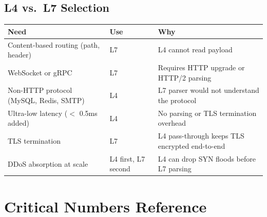\documentclass[11pt,a4paper]{article}
\begin{document}
\subsection{L4 vs.\ L7 Selection}

\medskip
\begin{tabularx}{\linewidth}{@{}lXX@{}}
  \toprule
  \textbf{Need} & \textbf{Use} & \textbf{Why} \\
  \midrule
  Content-based routing (path, header) & L7 & L4 cannot read payload \\
  WebSocket or gRPC & L7 & Requires HTTP upgrade or HTTP/2 parsing \\
  Non-HTTP protocol (MySQL, Redis, SMTP) & L4 & L7 parser would not understand the protocol \\
  Ultra-low latency ($<$ 0.5ms added) & L4 & No parsing or TLS termination overhead \\
  TLS termination & L7 & L4 pass-through keeps TLS encrypted end-to-end \\
  DDoS absorption at scale & L4 first, L7 second & L4 can drop SYN floods before L7 parsing \\
  \bottomrule
\end{tabularx}
\medskip

\section{Critical Numbers Reference}
\end{document}
